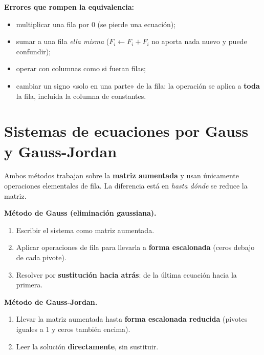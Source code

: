 \documentclass[12pt, letterpaper]{article}
\begin{document}
\begin{cuadroadvertencia}
  \small
  \textbf{Errores que rompen la equivalencia:}
  \begin{itemize}[leftmargin=1.2em, nosep]
    \item multiplicar una fila por $0$ (se pierde una ecuación);
    \item sumar a una fila \emph{ella misma} ($F_i\leftarrow F_i+F_i$ no
          aporta nada nuevo y puede confundir);
    \item operar con columnas como si fueran filas;
    \item cambiar un signo «solo en una parte» de la fila: la operación se
          aplica a \textbf{toda} la fila, incluida la columna de constantes.
  \end{itemize}
\end{cuadroadvertencia}

\section{Sistemas de ecuaciones por Gauss y Gauss-Jordan}

Ambos métodos trabajan sobre la \textbf{matriz aumentada} y usan únicamente
operaciones elementales de fila. La diferencia está en \emph{hasta dónde}
se reduce la matriz.

\begin{cuadroteoria}
  \small
  \textbf{Método de Gauss (eliminación gaussiana).}
  \begin{enumerate}[leftmargin=1.4em, nosep]
    \item Escribir el sistema como matriz aumentada.
    \item Aplicar operaciones de fila para llevarla a \textbf{forma
          escalonada} (ceros debajo de cada pivote).
    \item Resolver por \textbf{sustitución hacia atrás}: de la última
          ecuación hacia la primera.
  \end{enumerate}
  \textbf{Método de Gauss-Jordan.}
  \begin{enumerate}[leftmargin=1.4em, nosep]
    \item Llevar la matriz aumentada hasta \textbf{forma escalonada
          reducida} (pivotes iguales a $1$ y ceros también encima).
    \item Leer la solución \textbf{directamente}, sin sustituir.
  \end{enumerate}
\end{cuadroteoria}
\end{document}
